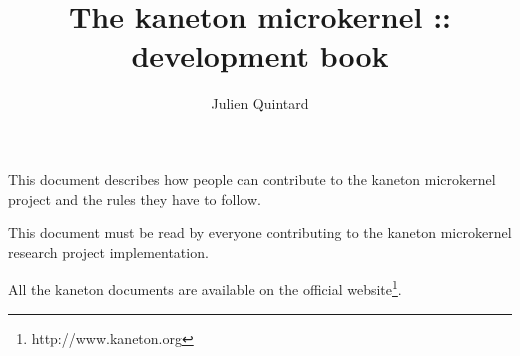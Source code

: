 %
%
%
%
%
%

%
%

%
%

\def\path{../..}

%
%



%
%

\rhead{}

%
%

\title{The kaneton microkernel :: development book
       \logos}

%
%

\author{\small{Julien Quintard}}

%
%



%
%

\maketitle

%
%

This document describes how people can contribute to the kaneton microkernel
project and the rules they have to follow.

\-

This document must be read by everyone contributing to the kaneton
microkernel research project implementation.

\-

All the kaneton documents are available on
  the official website\footnote{http://www.kaneton.org}.

%
%

\toc

%
%












